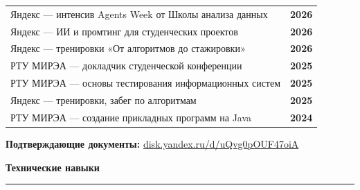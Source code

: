 \documentclass[a4paper,10pt]{article}
\newcommand{\fontSection}{%
    \fontsize{14.5}{16.8}\selectfont
}
\newcommand{\fontEducationBody}{%
    \fontsize{10.3}{12.1}\selectfont
}
\newcommand{\fontEducationDate}{%
    \fontsize{10}{11.6}\selectfont
}
\newcommand{\spaceBeforeSection}{9pt}
\newcommand{\spaceSectionToLine}{-4.5pt}
\newcommand{\spaceAfterSectionLine}{5.5pt}
\newcommand{\resumeSection}[1]{%
    \par
    \vspace{\spaceBeforeSection}%
    {%
        \fontSection
        \bfseries
        \color{accent}
        #1\par
    }%
    \vspace{\spaceSectionToLine}%
    {%
        \color{accent}
        \noindent
        \rule{\textwidth}{0.7pt}\par
    }%
    \vspace{\spaceAfterSectionLine}%
}
\newcommand{\visibleLink}[2]{%
    \href{#1}{\textcolor{accent}{#2}}%
}
\begin{document}
\begin{tabularx}{\textwidth}{@{}Xr@{}}

    {\fontEducationBody
    Яндекс — интенсив Agents Week от Школы анализа данных}
    &
    {\fontEducationDate\bfseries 2026}

    \\[4pt]

    {\fontEducationBody
    Яндекс — ИИ и промтинг для студенческих проектов}
    &
    {\fontEducationDate\bfseries 2026}

    \\[4pt]

    {\fontEducationBody
    Яндекс — тренировки «От алгоритмов до стажировки»}
    &
    {\fontEducationDate\bfseries 2026}

    \\[4pt]

    {\fontEducationBody
    РТУ МИРЭА — докладчик студенческой конференции}
    &
    {\fontEducationDate\bfseries 2025}

    \\[4pt]

    {\fontEducationBody
    РТУ МИРЭА — основы тестирования информационных систем}
    &
    {\fontEducationDate\bfseries 2025}

    \\[4pt]

    {\fontEducationBody
    Яндекс — тренировки, забег по алгоритмам}
    &
    {\fontEducationDate\bfseries 2025}

    \\[4pt]

    {\fontEducationBody
    РТУ МИРЭА — создание прикладных программ на Java}
    &
    {\fontEducationDate\bfseries 2024}

\end{tabularx}

\vspace{6pt}

{%
    \fontEducationBody
    \textbf{Подтверждающие документы:}
    \visibleLink
    {https://disk.yandex.ru/d/uQvg0pOUF47oiA}
    {disk.yandex.ru/d/uQvg0pOUF47oiA}
}


\resumeSection{Технические навыки}
\end{document}
